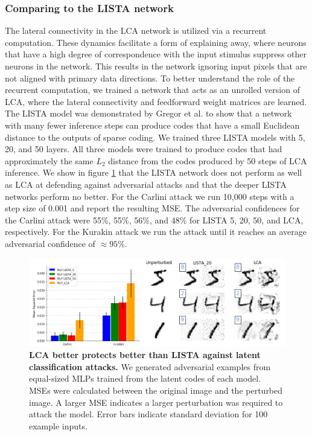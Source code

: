 \subsubsection{Comparing to the LISTA network}
The lateral connectivity in the LCA network is utilized via a recurrent computation. These dynamics facilitate a form of explaining away, where neurons that have a high degree of correspondence with the input stimulus suppress other neurons in the network. This results in the network ignoring input pixels that are not aligned with primary data directions. To better understand the role of the recurrent computation, we trained a network that acts as an unrolled version of LCA, where the lateral connectivity and feedforward weight matrices are learned. The LISTA model was demonstrated by Gregor et al. \citeyearpar{gregor2010learning} to show that a network with many fewer inference steps can produce codes that have a small Euclidean distance to the outputs of sparse coding. We trained three LISTA models with 5, 20, and 50 layers. All three models were trained to produce codes that had approximately the same $L_{2}$ distance from the codes produced by 50 steps of LCA inference. We show in figure \ref{fig:ch4_adversarial_lista_vs_lca} that the LISTA network does not perform as well as LCA at defending against adversarial attacks and that the deeper LISTA networks perform no better. For the Carlini \parencite{carlini2017towards} attack we run 10,000 steps with a step size of 0.001 and report the resulting MSE. The adversarial confidences for the Carlini attack were 55\%, 55\%, 56\%, and 48\% for LISTA 5, 20, 50, and LCA, respectively. For the Kurakin \cite{kurakin2016adversarial} attack we run the attack until it reaches an average adversarial confidence of $\approx95$\%. 

\begin{figure}[h]
    \centering
    \includegraphics[width=\textwidth]{figures/adversarial_lista_vs_lca.png}
    \caption{\textbf{LCA better protects better than LISTA against latent classification attacks.} We generated adversarial examples from equal-sized MLPs trained from the latent codes of each model. MSEs were calculated between the original image and the perturbed image. A larger MSE indicates a larger perturbation was required to attack the model. Error bars indicate standard deviation for 100 example inputs.}
    \label{fig:ch4_adversarial_lista_vs_lca}
\end{figure}


